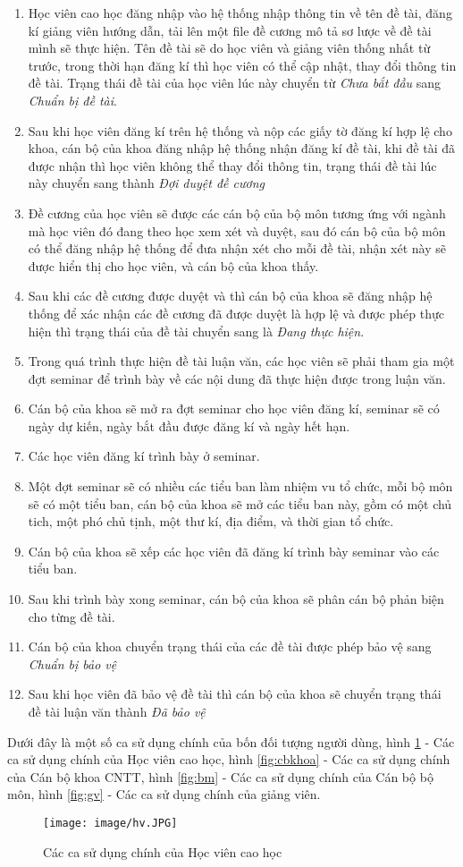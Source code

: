 \begin{enumerate}
\item Học viên cao học đăng nhập vào hệ thống nhập thông tin về tên đề tài, đăng kí giảng viên hướng dẫn, tải lên một file đề cương mô tả sơ lược về đề tài mình sẽ thực hiện. Tên đề tài sẽ do học viên và giảng viên thống nhất từ trước, trong thời hạn đăng kí thì học viên có thể cập nhật, thay đổi thông tin đề tài. Trạng thái đề tài của học viên lúc này chuyển từ \textit{Chưa bắt đầu} sang \textit{Chuẩn bị đề tài}.
\item Sau khi học viên đăng kí trên hệ thống và nộp các giấy tờ đăng kí hợp lệ cho khoa, cán bộ của khoa đăng nhập hệ thống nhận đăng kí đề tài, khi đề tài đã được nhận thì học viên không thể thay đổi thông tin, trạng thái đề tài lúc này chuyển sang thành \textit{Đợi duyệt đề cương}
\item Đề cương của học viên sẽ được các cán bộ của bộ môn tương ứng với ngành mà học viên đó đang theo học xem xét và duyệt, sau đó cán bộ của bộ môn có thể đăng nhập hệ thống để đưa nhận xét cho mỗi đề tài, nhận xét này sẽ được hiển thị cho học viên, và cán bộ của khoa thấy.
\item Sau khi các đề cương được duyệt và thì cán bộ của khoa sẽ đăng nhập hệ thống để xác nhận các đề cương đã được duyệt là hợp lệ và được phép thực hiện thì trạng thái của đề tài chuyển sang là \textit{Đang thực hiện}.
\item Trong quá trình thực hiện đề tài luận văn, các học viên sẽ phải tham gia một đợt seminar để trình bày về các nội dung đã thực hiện được trong luận văn.
\item Cán bộ của khoa sẽ mở ra đợt seminar cho học viên đăng kí, seminar sẽ có ngày dự kiến, ngày bắt đầu được đăng kí và ngày hết hạn.
\item Các học viên đăng kí trình bày ở seminar.
\item Một đợt seminar sẽ có nhiều các tiểu ban làm nhiệm vu tổ chức, mỗi bộ môn sẽ có một tiểu ban, cán bộ của khoa sẽ mở các tiểu ban này, gồm có một chủ tich, một phó chủ tịnh, một thư kí, địa điểm, và thời gian tổ chức.
\item Cán bộ của khoa sẽ xếp các học viên đã đăng kí trình bày seminar vào các tiểu ban.
\item Sau khi trình bày xong seminar, cán bộ của khoa sẽ phân cán bộ phản biện cho từng đề tài.
\item Cán bộ của khoa chuyển trạng thái của các đề tài được phép bảo vệ sang \textit{Chuẩn bị bảo vệ}
\item Sau khi học viên đã bảo vệ đề tài thì cán bộ của khoa sẽ chuyển trạng thái đề tài luận văn thành \textit{
Đã bảo vệ}
\end{enumerate}
Dưới đây là một số ca sử dụng chính của bốn đối tượng người dùng, hình \ref{fig:hv} - Các ca sử dụng chính của Học viên cao học, hình \ref{fig:cbkhoa} - Các ca sử dụng chính của Cán bộ khoa CNTT, hình \ref{fig:bm} - Các ca sử dụng chính của Cán bộ bộ môn, hình \ref{fig:gv} - Các ca sử dụng chính của giảng viên.
\begin{figure}[htbp]
	\centering
		\texttt{[image: image/hv.JPG]}
	\caption{Các ca sử dụng chính của Học viên cao học}
	\label{fig:hv}
\end{figure}

